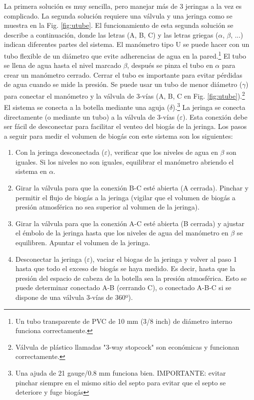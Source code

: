 \documentclass[]{article}
\begin{document}
La primera solución es muy sencilla, pero manejar más de 3 jeringas a la vez es complicado.
La segunda solución requiere una válvula y una jeringa como se muestra en la Fig. \ref{fig:utube}.
El funcionamiento de esta segunda solución se describe a continuación, donde las letras (A, B, C) y las letras griegas ($\alpha$, $\beta$, ...) indican diferentes partes del sistema.
El manómetro tipo U se puede hacer con un tubo flexible de un diámetro que evite adherencias de agua en la pared.\footnote{Un tubo transparente de PVC de 10 mm (3/8 inch) de diámetro interno funciona correctamente.}
El tubo se llena de agua hasta el nivel marcado $\beta$, después se pinza el tubo en $\alpha$ para crear un manómetro cerrado.
Cerrar el tubo es importante para evitar pérdidas de agua cuando se mide la presión.
Se puede usar un tubo de menor diámetro ($\gamma$) para conectar el manómetro y la válvula de 3-vías (A, B, C en Fig. \ref{fig:utube}).\footnote{Válvula de plástico llamadas "3-way stopcock" son económicas y funcionan correctamente.}
El sistema se conecta a la botella mediante una aguja ($\delta$).\footnote{Una ajuda de 21 gauge/0.8 mm funciona bien. IMPORTANTE: evitar pinchar siempre en el mismo sitio del septo para evitar que el septo se deteriore y fuge biogás}
La jeringa se conecta directamente (o mediante un tubo) a la válvula de 3-vías ($\varepsilon$).
Esta conexión debe ser fácil de desconectar para facilitar el venteo del biogás de la jeringa.
Los pasos a seguir para medir el volumen de biogás con este sistema son los siguientes:

\begin{enumerate}
  \item Con la jeringa desconectada ($\varepsilon$), verificar que los niveles de agua en $\beta$ son iguales. Si los niveles no son iguales, equilibrar el manómetro abriendo el sistema en $\alpha$.
  \item Girar la válvula para que la conexión B-C esté abierta (A cerrada). Pinchar y permitir el flujo de biogás a la jeringa (vigilar que el volumen de biogás a presión atmosférica no sea superior al volumen de la jeringa).
  \item Girar la válvula para que la conexión A-C esté abierta (B cerrada) y ajustar el émbolo de la jeringa hasta que los niveles de agua del manómetro en $\beta$ se equilibren. Apuntar el volumen de la jeringa.
  \item Desconectar la jeringa ($\varepsilon$), vaciar el biogas de la jeringa y volver al paso 1 hasta que todo el exceso de biogás se haya medido. Es decir, hasta que la presión del espacio de cabeza de la botella sea la presión atmosférica. Esto se puede determinar conectado A-B (cerrando C), o conectado A-B-C si se dispone de una válvula 3-vías de 360º).
\end{enumerate}
\end{document}
